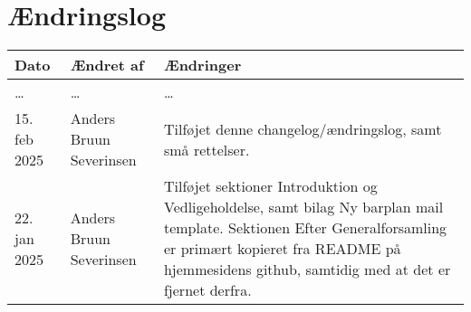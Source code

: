 \section{Ændringslog}
\label{sec:changelog}

\begin{tabular}{l l l}
    \textbf{Dato} & \textbf{Ændret af} & \textbf{Ændringer} \\
    \hline
    \begin{minipage}[t]
        {0.15\linewidth}
        \dots
    \end{minipage} &
    \begin{minipage}[t]
        {0.35\linewidth}
        \dots
    \end{minipage} & 
    \begin{minipage}[t]
        {0.5\linewidth}
        \dots
    \end{minipage} \\
    \hline
    \begin{minipage}[t]
        {0.15\linewidth}
        15. feb 2025
    \end{minipage} &
    \begin{minipage}[t]
        {0.35\linewidth}
        Anders Bruun Severinsen
    \end{minipage} & 
    \begin{minipage}[t]
        {0.5\linewidth}
        Tilføjet denne changelog/ændringslog, samt små rettelser.
    \end{minipage} \\
    \hline
    \begin{minipage}[t]
        {0.15\linewidth}
        22. jan 2025
    \end{minipage} &
    \begin{minipage}[t]
        {0.35\linewidth}
        Anders Bruun Severinsen
    \end{minipage} & 
    \begin{minipage}[t]
        {0.5\linewidth}
        Tilføjet sektioner Introduktion og Vedligeholdelse, samt bilag Ny barplan mail template.
        Sektionen Efter Generalforsamling er primært kopieret fra README på hjemmesidens 
        github, samtidig med at det er fjernet derfra.
    \end{minipage} \\
    \hline
\end{tabular}